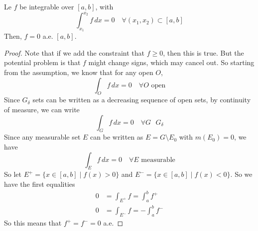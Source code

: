   \begin{lemma} 
    Le $f$ be integrable over $[a, b]$, with 
    \begin{equation}
      \int_{x_1}^{x_2} f\, dx = 0 \quad \forall (x_1, x_2) \subset [a, b]
    \end{equation}
    Then, $f = 0$ a.e. $[a, b]$. 
  \end{lemma}
  \begin{proof}
    Note that if we add the constraint that $f \geq 0$, then this is true. But the potential problem is that $f$ might change signs, which may cancel out. So starting from the assumption, we know that for any open $O$, 
    \begin{equation}
      \int_O f \,dx = 0 \quad \forall O \text{ open} 
    \end{equation}
    Since $G_\delta$ sets can be written as a decreasing sequence of open sets, by continuity of measure, we can write 
    \begin{equation}
      \int_G f \,dx = 0 \quad \forall G \text{ } G_\delta
    \end{equation}
    Since any measurable set $E$ can be written as $E = G \setminus E_0$ with $m(E_0) = 0$, we have 
    \begin{equation}
      \int_E f \,dx = 0 \quad \forall E \text{ measurable}
    \end{equation}
    So let $E^+ = \{ x \in [a, b] \mid f(x) > 0\}$ and $E^- = \{ x \in [a, b] \mid f(x) < 0\}$. So we have the first equalities
    \begin{align}
      0 & = \int_{E^+} f = \int_a^b f^+ \\
      0 & = \int_{E^-} f = - \int_a^b f^-  
    \end{align}
    So this means that $f^+ = f^- = 0$ a.e. 
  \end{proof}

